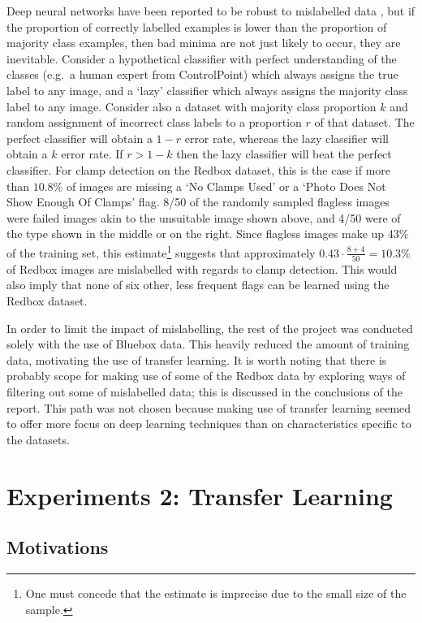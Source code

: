 \documentclass[a4paper,11pt]{article}
\begin{document}
Deep neural networks have been reported to be robust to mislabelled data \cite{DL-book}, but if the proportion of correctly labelled examples is lower than the proportion of majority class examples, then bad minima are not just likely to occur, they are inevitable. Consider a hypothetical classifier with perfect understanding of the classes (e.g.\ a human expert from ControlPoint) which always assigns the true label to any image, and a `lazy' classifier which always assigns the majority class label to any image. Consider also a dataset with majority class proportion $k$ and random assignment of incorrect class labels to a proportion $r$ of that dataset. The perfect classifier will obtain a $1-r$ error rate, whereas the lazy classifier will obtain a $k$ error rate. If $r > 1-k$ then the lazy classifier will beat the perfect classifier. For clamp detection on the Redbox dataset, this is the case if more than $10.8\%$ of images are missing a `No Clamps Used' or a `Photo Does Not Show Enough Of Clamps' flag. 8/50 of the randomly sampled flagless images were failed images akin to the unsuitable image shown above, and 4/50 were of the type shown in the middle or on the right. Since flagless images make up 43\% of the training set, this estimate\footnote{One must concede that the estimate is imprecise due to the small size of the sample.} suggests that approximately $0.43\cdot\frac{8+4}{50} = 10.3\%$ of Redbox images are mislabelled with regards to clamp detection. This would also imply that none of six other, less frequent flags can be learned using the Redbox dataset.

In order to limit the impact of mislabelling, the rest of the project was conducted solely with the use of Bluebox data. This heavily reduced the amount of training data, motivating the use of transfer learning. It is worth noting that there is probably scope for making use of some of the Redbox data by exploring ways of filtering out some of mislabelled data; this is discussed in the conclusions of the report. This path was not chosen because making use of transfer learning seemed to offer more focus on deep learning techniques than on characteristics specific to the datasets.


\clearpage
\section{Experiments 2: Transfer Learning}

\subsection{Motivations}
\end{document}
